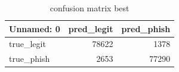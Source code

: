 \begin{table}[htbp]
\caption{confusion matrix best}
\label{tab:confusion_matrix_best}
\begin{tabular}{lrr}
\toprule
Unnamed: 0 & pred_legit & pred_phish \\
\midrule
true\_legit & 78622 & 1378 \\
true\_phish & 2653 & 77290 \\
\bottomrule
\end{tabular}
\end{table}
